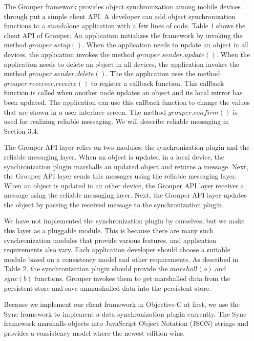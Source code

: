 \documentclass[twocolumn,10pt]{article}
\begin{document}
The Grouper framework provides object synchronization among mobile devices through put a simple client API.
A developer can add object synchronization functions to a standalone application with a few lines of code.
Table 1 shows the client API of Grouper.
An application initializes the framework by invoking the method $grouper.setup()$.
When the application needs to update an object in all devices, the application invokes the method $grouper.sender.update()$.
When the application needs to delete an object in all devices, the application invokes the method $grouper.sender.delete()$.
The the application uses the method $grouper.receiver.receive()$ to register a callback function.
This callback function is called when another node updates an object and its local mirror has been updated.
The application can use this callback function to change the values that are shown in a user interface screen.
The method $grouper.confirm()$ is used for realizing reliable messaging.
We will describe reliable messaging in Section 3.4.

The Grouper API layer relies on two modules: the synchronization plugin and the reliable messaging layer.
When an object is updated in a local device, the synchronization plugin marshalls an updated object and returns a message.
Next, the Grouper API layer sends this messages using the reliable messaging layer.
When an object is updated in an other device, the Grouper API layer receives a message using the reliable messaging layer.
Next, the Grouper API layer updates the object by passing the received message to the synchronization plugin.

We have not implemented the synchronization plugin by ourselves, but we make this layer as a pluggable module.
This is because there are many such synchronization modules that provide various features, and application requirements also vary.
Each application developer should choose a suitable module based on a consistency model and other requirements.
As described in Table 2, the synchronization plugin should provide the $marshall(o)$ and $sync(b)$ functions.
Grouper invokes them to get marshalled data from the persistent store and save unmarshalled data into the persistent store.

Because we implement our client framework in Objective-C at first, we use the Sync framework\cite{sync} to implement a data synchronization plugin currently.
The Sync framework marshalls objects into JavaScript Object Notation (JSON) strings and provides a consistency model where the newest edition wins.
\end{document}
